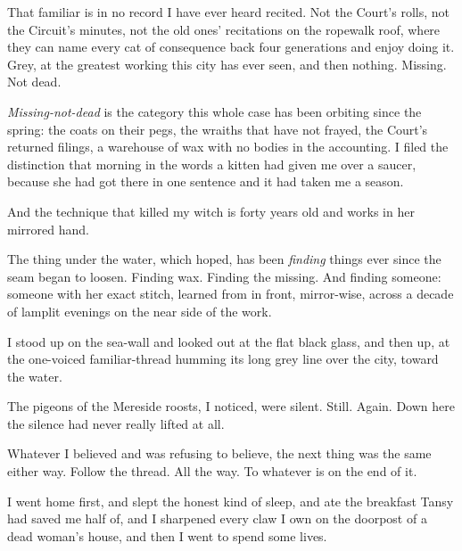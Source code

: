 That familiar is in no record I have ever heard recited. Not the Court's rolls, not the Circuit's minutes, not the old ones' recitations on the ropewalk roof, where they can name every cat of consequence back four generations and enjoy doing it. Grey, at the greatest working this city has ever seen, and then nothing. Missing. Not dead.

\emph{Missing-not-dead} is the category this whole case has been orbiting since the spring: the coats on their pegs, the wraiths that have not frayed, the Court's returned filings, a warehouse of wax with no bodies in the accounting. I filed the distinction that morning in the words a kitten had given me over a saucer, because she had got there in one sentence and it had taken me a season.

And the technique that killed my witch is forty years old and works in her mirrored hand.

The thing under the water, which hoped, has been \emph{finding} things ever since the seam began to loosen. Finding wax. Finding the missing. And finding someone: someone with her exact stitch, learned from in front, mirror-wise, across a decade of lamplit evenings on the near side of the work.

I stood up on the sea-wall and looked out at the flat black glass, and then up, at the one-voiced familiar-thread humming its long grey line over the city, toward the water.

The pigeons of the Mereside roosts, I noticed, were silent. Still. Again. Down here the silence had never really lifted at all.

Whatever I believed and was refusing to believe, the next thing was the same either way. Follow the thread. All the way. To whatever is on the end of it.

I went home first, and slept the honest kind of sleep, and ate the breakfast Tansy had saved me half of, and I sharpened every claw I own on the doorpost of a dead woman's house, and then I went to spend some lives.
